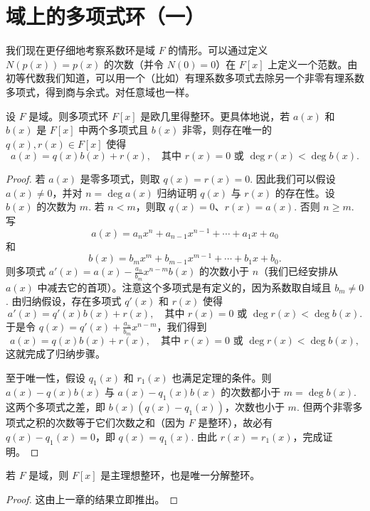 \section{域上的多项式环（一）}

我们现在更仔细地考察系数环是域 \(F\) 的情形。可以通过定义 \(N(p(x)) = p(x)\) 的次数（并令 \(N(0) = 0\)）在 \(F[x]\) 上定义一个范数。由初等代数我们知道，可以用一个（比如）有理系数多项式去除另一个非零有理系数多项式，得到商与余式。对任意域也一样。

\begin{theorem}\label{thm:9.3}
设 \(F\) 是域。则多项式环 \(F[x]\) 是欧几里得整环。更具体地说，若 \(a(x)\) 和 \(b(x)\) 是 \(F[x]\) 中两个多项式且 \(b(x)\) 非零，则存在唯一的 \(q(x), r(x) \in F[x]\) 使得
\[
a(x) = q(x)b(x) + r(x), \quad \text{其中 } r(x) = 0 \text{ 或 } \deg r(x) < \deg b(x).
\]
\end{theorem}

\begin{proof}
若 \(a(x)\) 是零多项式，则取 \(q(x) = r(x) = 0\). 因此我们可以假设 \(a(x) \neq 0\)，并对 \(n = \deg a(x)\) 归纳证明 \(q(x)\) 与 \(r(x)\) 的存在性。设 \(b(x)\) 的次数为 \(m\). 若 \(n < m\)，则取 \(q(x) = 0\)、\(r(x) = a(x)\). 否则 \(n \geq m\). 写
\[
a(x) = a_nx^n + a_{n-1}x^{n-1} + \cdots + a_1x + a_0
\]
和
\[
b(x) = b_mx^m + b_{m-1}x^{m-1} + \cdots + b_1x + b_0.
\]
则多项式 \(a'(x) = a(x) - \frac{a_n}{b_m}x^{n-m}b(x)\) 的次数小于 \(n\)（我们已经安排从 \(a(x)\) 中减去它的首项）。注意这个多项式是有定义的，因为系数取自域且 \(b_m \neq 0\). 由归纳假设，存在多项式 \(q'(x)\) 和 \(r(x)\) 使得
\[
a'(x) = q'(x)b(x) + r(x), \quad \text{其中 } r(x) = 0 \text{ 或 } \deg r(x) < \deg b(x).
\]
于是令 \(q(x) = q'(x) + \frac{a_n}{b_m}x^{n-m}\)，我们得到
\[
a(x) = q(x)b(x) + r(x), \quad \text{其中 } r(x) = 0 \text{ 或 } \deg r(x) < \deg b(x),
\]
这就完成了归纳步骤。

至于唯一性，假设 \(q_1(x)\) 和 \(r_1(x)\) 也满足定理的条件。则 \(a(x) - q(x)b(x)\) 与 \(a(x) - q_1(x)b(x)\) 的次数都小于 \(m = \deg b(x)\). 这两个多项式之差，即 \(b(x)(q(x) - q_1(x))\)，次数也小于 \(m\). 但两个非零多项式之积的次数等于它们次数之和（因为 \(F\) 是整环），故必有 \(q(x) - q_1(x) = 0\)，即 \(q(x) = q_1(x)\). 由此 \(r(x) = r_1(x)\)，完成证明。
\end{proof}

\begin{corollary}\label{cor:9.4}
若 \(F\) 是域，则 \(F[x]\) 是主理想整环，也是唯一分解整环。
\end{corollary}

\begin{proof}
这由上一章的结果立即推出。
\end{proof}

